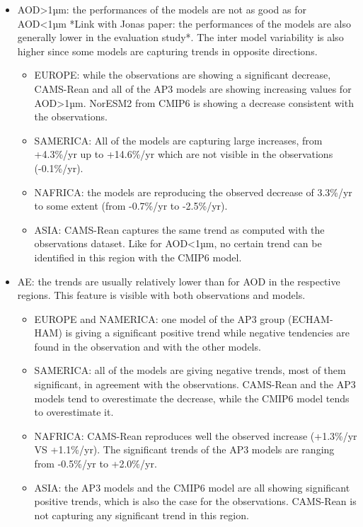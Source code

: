 \documentclass[journal abbreviation, manuscript]{copernicus}
\begin{document}
\begin{itemize}
\begin{itemize}
       \end{itemize}
 \item AOD>1µm: the performances of the models are not as good as for AOD<1µm *Link with Jonas paper: the performances of the models are also generally lower in the evaluation study*. The inter model variability is also higher since some models are capturing trends in opposite directions.
       \begin{itemize}
        \item EUROPE: while the observations are showing a significant decrease, CAMS-Rean and all of the AP3 models are showing increasing values for AOD>1µm. NorESM2 from CMIP6 is showing a decrease consistent with the observations.
        \item SAMERICA: All of the models are capturing large increases, from +4.3\%/yr up to +14.6\%/yr  which are not visible in the observations (-0.1\%/yr). 
        \item NAFRICA: the models are reproducing the observed decrease of 3.3\%/yr to some extent (from -0.7\%/yr to -2.5\%/yr). 
        \item ASIA: CAMS-Rean captures the same trend as computed with the observations dataset. Like for AOD<1µm, no certain trend can be identified  in this region with the CMIP6 model.
       \end{itemize}
 \item AE: the trends are usually relatively lower than for AOD in the respective regions. This feature is visible with both observations and models.
       \begin{itemize}
        \item EUROPE and NAMERICA: one model of the AP3 group (ECHAM-HAM) is giving a significant positive trend while negative tendencies are found in the observation and with the other models.
        \item SAMERICA: all of the models are giving negative trends, most of them significant, in agreement with the observations. CAMS-Rean and the AP3 models tend to overestimate the decrease, while the CMIP6 model tends to overestimate it.
        \item NAFRICA: CAMS-Rean reproduces well the observed increase (+1.3\%/yr VS +1.1\%/yr). The significant trends of the AP3 models are ranging from -0.5\%/yr to +2.0\%/yr.
        \item ASIA: the AP3 models and the CMIP6 model are all showing significant positive trends, which is also the case for the observations. CAMS-Rean is not capturing any significant trend in this region.

\end{itemize}
\end{itemize}
\end{document}
